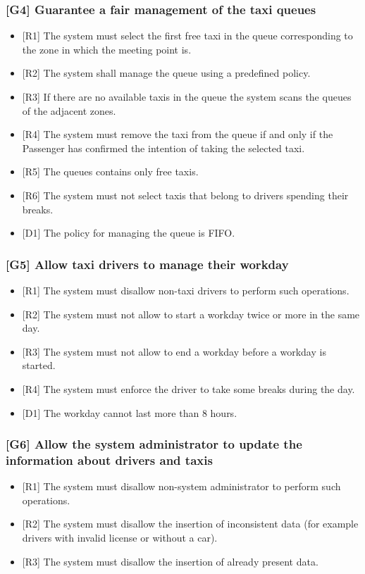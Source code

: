 \documentclass[a4paper,12pt]{article}%
\begin{document}
\subsubsection{{[}G4{]} Guarantee a fair management of the taxi queues}
\begin{itemize}
\item {[}R1{]} The system must select the first free taxi in the queue corresponding to the zone in which the meeting point is.
\item {[}R2{]} The system shall manage the queue using a predefined policy.
\item {[}R3{]} If there are no available taxis in the queue the system scans the queues of the adjacent zones.
\item {[}R4{]} The system must remove the taxi from the queue if and only if the Passenger has confirmed the intention of taking the selected taxi.
\item {[}R5{]} The queues contains only free taxis.
\item {[}R6{]} The system must not select taxis that belong to drivers spending their breaks.
\item {[}D1{]} The policy for managing the queue is FIFO.
\end{itemize}
\label{goal4}
\subsubsection{{[}G5{]} Allow taxi drivers to manage their workday}
\begin{itemize}
\item {[}R1{]} The system must disallow non-taxi drivers to perform such operations.
\item {[}R2{]} The system must not allow to start a workday twice or more in the same day.
\item {[}R3{]} The system must not allow to end a workday before a workday is started.
\item {[}R4{]} The system must enforce the driver to take some breaks during the day.
\item {[}D1{]} The workday cannot last more than 8 hours.
\end{itemize}
\label{goal5}
\subsubsection{{[}G6{]} Allow the system administrator to update the information about drivers and taxis}
\begin{itemize}
\item {[}R1{]} The system must disallow non-system administrator to perform such operations.
\item {[}R2{]} The system must disallow the insertion of inconsistent data (for example drivers with invalid license or without a car).
\item {[}R3{]} The system must disallow the insertion of already present data.
\end{itemize}
\label{goal6}
\end{document}
